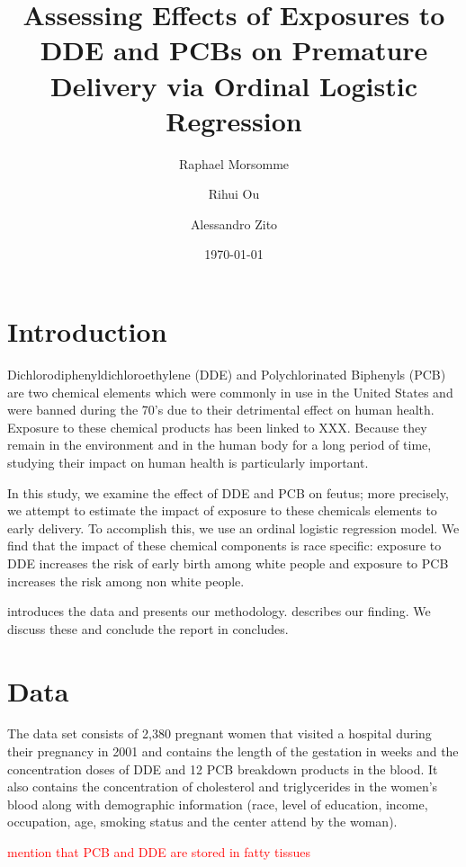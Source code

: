\documentclass[wcp]{jmlr}%
\title[DDE and PCB effect on Premature delivery]{Assessing Effects of Exposures to DDE and PCBs on Premature Delivery via Ordinal Logistic Regression}	%
\author[Morsomme, Ou, Zito]{Raphael Morsomme \and Rihui Ou \and Alessandro Zito}
\date{\today} %
\newcommand\todo[1]{\textcolor{red}{#1}}
\begin{document}
\maketitle


\section{Introduction}
\label{sec:intro}

Dichlorodiphenyldichloroethylene (DDE) and Polychlorinated Biphenyls (PCB) are two chemical elements which were commonly in use in the United States and were banned during the 70's due to their detrimental effect on human health. Exposure to these chemical products has been linked to XXX. Because they remain in the environment and in the human body for a long period of time, studying their impact on human health is particularly important.

In this study, we examine the effect of DDE and PCB on feutus; more precisely, we attempt to estimate the impact of exposure to these chemicals elements to early delivery. To accomplish this, we use an ordinal logistic regression model. We find that the impact of these chemical components is race specific: exposure to DDE increases the risk of early birth among white people and exposure to PCB increases the risk among non white people.


 introduces the data and  presents our methodology.
 describes our finding.
We discuss these and conclude the report in  concludes.

\section{Data}
\label{sec:data}
The data set consists of 2,380 pregnant women that visited a hospital during their pregnancy in 2001 and contains the length of the gestation in weeks and the concentration doses of DDE and 12 PCB breakdown products in the blood. It also contains the concentration of cholesterol and triglycerides in the women's blood along with demographic information (race, level of education, income, occupation, age, smoking status and the center attend by the woman).

\todo{mention that PCB and DDE are stored in fatty tissues}
\end{document}
